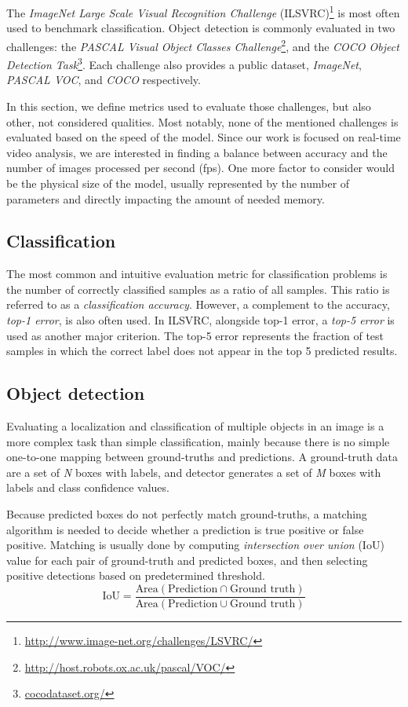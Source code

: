 The \textit{ImageNet Large Scale Visual Recognition Challenge }(ILSVRC)\footnote{\url{http://www.image-net.org/challenges/LSVRC/}} is most often used to benchmark classification. Object detection is commonly evaluated in two challenges: the \textit{PASCAL Visual Object Classes Challenge}\footnote{\url{http://host.robots.ox.ac.uk/pascal/VOC/}}, and the \textit{COCO Object Detection Task}\footnote{\url{cocodataset.org/}}. Each challenge also provides a public dataset, \textit{ImageNet}, \textit{PASCAL VOC}, and \textit{COCO} respectively.

In this section, we define metrics used to evaluate those challenges, but also other, not considered qualities. Most notably, none of the mentioned challenges is evaluated based on the speed of the model. Since our work is focused on real-time video analysis, we are interested in finding a balance between accuracy and the number of images processed per second (fps). One more factor to consider would be the physical size of the model, usually represented by the number of parameters and directly impacting the amount of needed memory.

\subsection{Classification}
The most common and intuitive evaluation metric for classification problems is the number of correctly classified samples as a ratio of all samples. This ratio is referred to as a \textit{classification accuracy}. However, a complement to the accuracy, \textit{top-1 error}, is also often used. In ILSVRC,  alongside top-1 error, a \textit{top-5 error} is used as another major criterion. The top-5 error represents the fraction of test samples in which the correct label does not appear in the top 5 predicted results.

\subsection{Object detection}
Evaluating a localization and classification of multiple objects in an image is a more complex task than simple classification, mainly because there is no simple one-to-one mapping between ground-truths and predictions. A ground-truth data are a set of \textit{N} boxes with labels, and detector generates a set of \textit{M} boxes with labels and class confidence values.

Because predicted boxes do not perfectly match ground-truths, a matching algorithm is needed to decide whether a prediction is true positive or false positive. Matching is usually done by computing \textit{intersection over union} (IoU) value for each pair of ground-truth and predicted boxes, and then selecting positive detections based on predetermined threshold.
$$\text{IoU} = \frac{\text{Area}(\text{Prediction} \cap \text{Ground truth})}{\text{Area}(\text{Prediction} \cup \text{Ground truth})}$$

